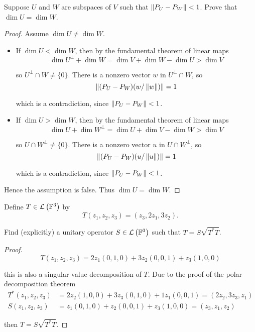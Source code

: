 \begin{exercise}
    Suppose $U$ and $W$ are subspaces of $V$ such that $\left\Vert{P_{U} - P_{W}}\right\Vert < 1$. Prove that $\dim U = \dim W$.
\end{exercise}

\begin{proof}
    Assume $\dim U\ne \dim W$.
    \begin{itemize}
        \item If $\dim U < \dim W$, then by the fundamental theorem of linear maps
              \[
                  \dim U^{\bot} + \dim W = \dim V + \dim W - \dim U > \dim V
              \]

              so $U^{\bot}\cap W\ne \{ 0 \}$. There is a nonzero vector $w$ in $U^{\bot}\cap W$, so
              \[
                  \left\Vert{(P_{U} - P_{W})(w/\left\Vert{w}\right\Vert)}\right\Vert = 1
              \]

              which is a contradiction, since $\left\Vert{P_{U} - P_{W}}\right\Vert < 1$.
        \item If $\dim U > \dim W$, then by the fundamental theorem of linear maps
              \[
                  \dim U + \dim W^{\bot} = \dim U + \dim V - \dim W > \dim V
              \]

              so $U\cap W^{\bot}\ne \{ 0 \}$. There is a nonzero vector $u$ in $U\cap W^{\bot}$, so
              \[
                  \left\Vert{(P_{U} - P_{W})(u/\left\Vert{u}\right\Vert)}\right\Vert = 1
              \]

              which is a contradiction, since $\left\Vert{P_{U} - P_{W}}\right\Vert < 1$.
    \end{itemize}

    Hence the assumption is false. Thus $\dim U = \dim W$.
\end{proof}
\newpage

\begin{exercise}
    Define $T\in\mathcal{L}\left({\mathbb{F}^{3}}\right)$ by
    \[
        T(z_{1}, z_{2}, z_{3}) = (z_{3}, 2z_{1}, 3z_{2}).
    \]

    Find (explicitly) a unitary operator $S\in\mathcal{L}\left({\mathbb{F}^{3}}\right)$ such that $T = S\sqrt{T^{*}T}$.
\end{exercise}

\begin{proof}
    \[
        T(z_{1}, z_{2}, z_{3}) = 2z_{1}(0, 1, 0)+ 3z_{2}(0, 0, 1) + z_{3}(1, 0, 0)
    \]

    this is also a singular value decomposition of $T$. Due to the proof of the polar decomposition theorem
    \begin{align*}
        T^{*}(z_{1}, z_{2}, z_{3}) & = 2z_{2}(1, 0, 0) + 3z_{3}(0, 1, 0) + 1z_{1}(0, 0, 1) = (2z_{2}, 3z_{3}, z_{1}) \\
        S(z_{1}, z_{2}, z_{3})     & = z_{1}(0, 1, 0) + z_{2}(0, 0, 1) + z_{3}(1, 0, 0) = (z_{3}, z_{1}, z_{2})
    \end{align*}

    then $T = S\sqrt{T^{*}T}$.
\end{proof}
\newpage

